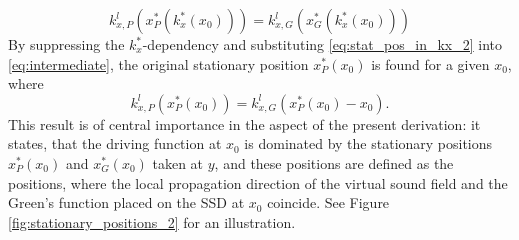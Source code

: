 \documentclass[12pt,a4paper]{article}
\begin{document}
%
\begin{equation} 
k^l_{x,P}(x^*_P(k^*_x(x_0))) = k^l_{x,G}(x^*_G(k^*_x(x_0)))
\label{eq:intermediate}
\end{equation}
By suppressing the $k^*_x$-dependency and substituting \eqref{eq:stat_pos_in_kx_2} into \eqref{eq:intermediate}, the original stationary position $x^*_P(x_0)$ is found for a given $x_0$, where 
\begin{equation}
k^l_{x,P}(x^*_P(x_0)) = k^l_{x,G}(x^*_P(x_0) - x_0).
\end{equation}
This result is of central importance in the aspect of the present derivation: it states, that the driving function at $x_0$ is dominated by the stationary positions $x^*_P(x_0)$ and $x^*_G(x_0)$ taken at $y$, and these positions are defined as the positions, where the local propagation direction of the virtual sound field and the Green's function placed on the SSD at $x_0$ coincide.
See Figure \ref{fig:stationary_positions_2} for an illustration.
\end{document}
